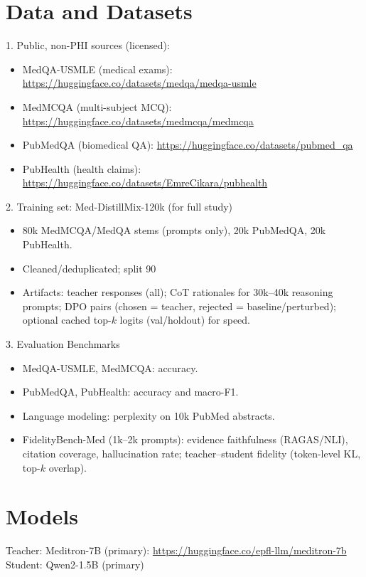 \documentclass[10pt]{article}
\begin{document}
\section*{Data and Datasets}
1. Public, non-PHI sources (licensed):
\begin{itemize}
\item MedQA-USMLE (medical exams): \url{https://huggingface.co/datasets/medqa/medqa-usmle}
\item MedMCQA (multi-subject MCQ): \url{https://huggingface.co/datasets/medmcqa/medmcqa}
\item PubMedQA (biomedical QA): \url{https://huggingface.co/datasets/pubmed_qa}
\item PubHealth (health claims): \url{https://huggingface.co/datasets/EmreCikara/pubhealth}
\end{itemize}

2. Training set: Med-DistillMix-120k (for full study)
\begin{itemize}
\item 80k MedMCQA/MedQA stems (prompts only), 20k PubMedQA, 20k PubHealth.
\item Cleaned/deduplicated; split 90%
\item Artifacts: teacher responses (all); CoT rationales for 30k--40k reasoning prompts; DPO pairs (chosen = teacher, rejected = baseline/perturbed); optional cached top-$k$ logits (val/holdout) for speed.
\end{itemize}

3. Evaluation Benchmarks
\begin{itemize}
\item MedQA-USMLE, MedMCQA: accuracy.
\item PubMedQA, PubHealth: accuracy and macro-F1.
\item Language modeling: perplexity on 10k PubMed abstracts.
\item FidelityBench-Med (1k--2k prompts): evidence faithfulness (RAGAS/NLI), citation coverage, hallucination rate; teacher--student fidelity (token-level KL, top-$k$ overlap).
\end{itemize}

\section*{Models}
Teacher: Meditron-7B (primary): \url{https://huggingface.co/epfl-llm/meditron-7b}
\\
Student: Qwen2-1.5B (primary)
\end{document}
